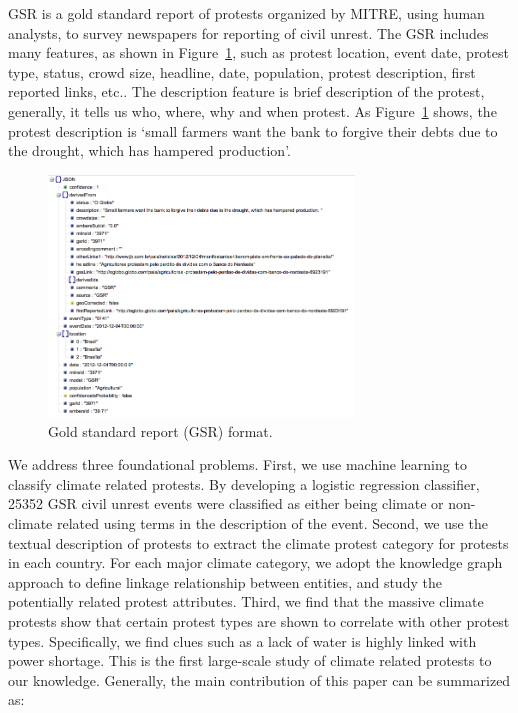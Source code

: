 GSR is a gold standard report of protests organized by MITRE, using human analysts, to survey newspapers for reporting of civil unrest. The GSR includes many features, as shown in Figure~\ref{GSR}, such as protest location, event date, protest type, status, crowd size, headline, date, population, protest description, first reported links, etc.. The description feature is brief description of the protest, generally, it tells us who, where, why and when protest. As Figure~\ref{GSR} shows, the protest description is `small farmers want the bank to forgive their debts due to the drought, which has hampered production'.

\begin{figure}[th]
\centerline
{\includegraphics[width = 3.2in]{figures/gsr_event_json.png}}
\caption{Gold standard report (GSR) format.}
\label{GSR}
\end{figure}


We address three foundational problems. First, we use machine learning to classify climate related protests. By developing a logistic regression classifier, 25352 GSR civil unrest events were classified as either being climate or non-climate related using terms in the description of the event. Second, we use the textual description of protests to extract the climate protest category for protests in each country. For each major climate category, we adopt the knowledge graph approach to define linkage relationship between entities, and study the potentially related protest attributes. Third, we find that the massive climate protests show that certain protest types are shown to correlate with other protest types. Specifically, we find clues such as a lack of water is highly linked with power shortage. This is the first large-scale study of climate related protests to our knowledge. Generally, the main contribution of this paper can be summarized as:

